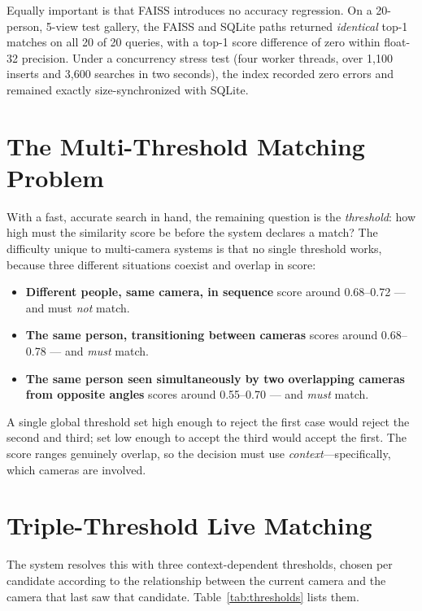 \documentclass[12pt]{report}
\begin{document}
Equally important is that FAISS introduces no accuracy regression. On a 20-person, 5-view test gallery, the FAISS and SQLite paths returned \emph{identical} top-1 matches on all 20 of 20 queries, with a top-1 score difference of zero within float-32 precision. Under a concurrency stress test (four worker threads, over 1{,}100 inserts and 3{,}600 searches in two seconds), the index recorded zero errors and remained exactly size-synchronized with SQLite.

\section{The Multi-Threshold Matching Problem}
With a fast, accurate search in hand, the remaining question is the \emph{threshold}: how high must the similarity score be before the system declares a match? The difficulty unique to multi-camera systems is that no single threshold works, because three different situations coexist and overlap in score:
\begin{itemize}
    \item \textbf{Different people, same camera, in sequence} score around 0.68--0.72 --- and must \emph{not} match.
    \item \textbf{The same person, transitioning between cameras} scores around 0.68--0.78 --- and \emph{must} match.
    \item \textbf{The same person seen simultaneously by two overlapping cameras from opposite angles} scores around 0.55--0.70 --- and \emph{must} match.
\end{itemize}
A single global threshold set high enough to reject the first case would reject the second and third; set low enough to accept the third would accept the first. The score ranges genuinely overlap, so the decision must use \emph{context}---specifically, which cameras are involved.

\section{Triple-Threshold Live Matching}
The system resolves this with three context-dependent thresholds, chosen per candidate according to the relationship between the current camera and the camera that last saw that candidate. Table~\ref{tab:thresholds} lists them.
\end{document}
